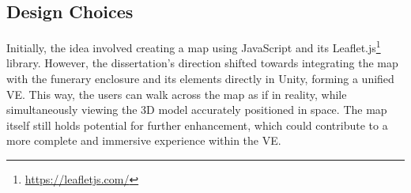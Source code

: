 \subsection{Design Choices}
Initially, the idea involved creating a map using JavaScript and its Leaflet.js\footnote{\url{https://leafletjs.com/}} library. 
However, the dissertation's direction shifted towards integrating the map with the funerary enclosure and its elements directly in Unity, forming a unified \gls{VE}. This way, the users can walk across the map as if in reality, while simultaneously viewing the \gls{3D} model accurately positioned in space. 
The map itself still holds potential for further enhancement, which could contribute to a more complete and immersive experience within the \gls{VE}.








